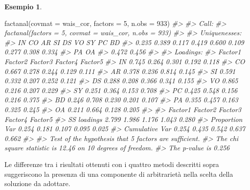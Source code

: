 \documentclass[
  11pt,
]{krantz}
\makeatletter
\newenvironment{Shaded}{\begin{snugshade}}{\end{snugshade}}
\newcommand{\AttributeTok}[1]{\textcolor[rgb]{0.61,0.61,0.61}{#1}}
\newcommand{\CommentTok}[1]{\textcolor[rgb]{0.37,0.37,0.37}{\textit{#1}}}
\newcommand{\DecValTok}[1]{\textcolor[rgb]{0.06,0.06,0.06}{#1}}
\newcommand{\FunctionTok}[1]{\textcolor[rgb]{0,0,0}{#1}}
\newcommand{\NormalTok}[1]{#1}
\newenvironment{kframe}{%
\medskip{}
\setlength{\fboxsep}{.8em}
 \def\at@end@of@kframe{}%
 \ifinner\ifhmode%
  \def\at@end@of@kframe{\end{minipage}}%
  \begin{minipage}{\columnwidth}%
 \fi\fi%
 \def\FrameCommand##1{\hskip\@totalleftmargin \hskip-\fboxsep
 \colorbox{shadecolor}{##1}\hskip-\fboxsep
     \hskip-\linewidth \hskip-\@totalleftmargin \hskip\columnwidth}%
 \MakeFramed {\advance\hsize-\width
   \@totalleftmargin\z@ \linewidth\hsize
   \@setminipage}}%
 {\par\unskip\endMakeFramed%
 \at@end@of@kframe}
\renewenvironment{Shaded}{\begin{kframe}}{\end{kframe}}
\theoremstyle{definition}
\theoremstyle{definition}
\newtheorem{example}{Esempio}[chapter]
\theoremstyle{definition}
\theoremstyle{definition}
\theoremstyle{remark}
\makeatother
\begin{document}
\begin{example}
\begin{Shaded}
\begin{Highlighting}[]
\FunctionTok{factanal}\NormalTok{(}\AttributeTok{covmat =}\NormalTok{ wais\_cor, }\AttributeTok{factors =} \DecValTok{5}\NormalTok{, }\AttributeTok{n.obs =} \DecValTok{933}\NormalTok{)}
\CommentTok{\#\textgreater{} }
\CommentTok{\#\textgreater{} Call:}
\CommentTok{\#\textgreater{} factanal(factors = 5, covmat = wais\_cor, n.obs = 933)}
\CommentTok{\#\textgreater{} }
\CommentTok{\#\textgreater{} Uniquenesses:}
\CommentTok{\#\textgreater{}    IN    CO    AR    SI    DS    VO    SY    PC    BD }
\CommentTok{\#\textgreater{} 0.235 0.389 0.117 0.419 0.600 0.109 0.277 0.308 0.334 }
\CommentTok{\#\textgreater{}    PA    OA }
\CommentTok{\#\textgreater{} 0.472 0.456 }
\CommentTok{\#\textgreater{} }
\CommentTok{\#\textgreater{} Loadings:}
\CommentTok{\#\textgreater{}    Factor1 Factor2 Factor3 Factor4 Factor5}
\CommentTok{\#\textgreater{} IN  0.745   0.264   0.301   0.192   0.118 }
\CommentTok{\#\textgreater{} CO  0.667   0.278   0.244   0.129   0.111 }
\CommentTok{\#\textgreater{} AR  0.378   0.236   0.814   0.145         }
\CommentTok{\#\textgreater{} SI  0.591   0.332   0.207   0.252   0.121 }
\CommentTok{\#\textgreater{} DS  0.288   0.208   0.366   0.341   0.155 }
\CommentTok{\#\textgreater{} VO  0.865   0.216   0.207   0.229         }
\CommentTok{\#\textgreater{} SY  0.251   0.364   0.153   0.708         }
\CommentTok{\#\textgreater{} PC  0.425   0.548   0.156   0.216   0.375 }
\CommentTok{\#\textgreater{} BD  0.246   0.708   0.230   0.201   0.107 }
\CommentTok{\#\textgreater{} PA  0.355   0.457   0.163   0.325   0.245 }
\CommentTok{\#\textgreater{} OA  0.211   0.664   0.128   0.205         }
\CommentTok{\#\textgreater{} }
\CommentTok{\#\textgreater{}                Factor1 Factor2 Factor3 Factor4 Factor5}
\CommentTok{\#\textgreater{} SS loadings      2.799   1.986   1.176   1.043   0.280}
\CommentTok{\#\textgreater{} Proportion Var   0.254   0.181   0.107   0.095   0.025}
\CommentTok{\#\textgreater{} Cumulative Var   0.254   0.435   0.542   0.637   0.662}
\CommentTok{\#\textgreater{} }
\CommentTok{\#\textgreater{} Test of the hypothesis that 5 factors are sufficient.}
\CommentTok{\#\textgreater{} The chi square statistic is 12.46 on 10 degrees of freedom.}
\CommentTok{\#\textgreater{} The p{-}value is 0.256}
\end{Highlighting}
\end{Shaded}

Le differenze tra i risultati ottenuti con i quattro metodi descritti sopra suggeriscono la presenza di una componente di arbitrarietà nella scelta della soluzione da adottare.
\end{example}
\end{document}
